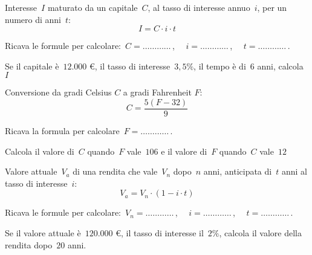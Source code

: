 \subsubsection*{}

\begin{esercizio}
\label{ese:20.53}
Interesse~\(I\) maturato da un capitale~\(C\), al tasso di interesse 
annuo~\(i\), 
per un numero di anni~\(t\):
\begin{equation*}
  I=C\cdot i\cdot t
\end{equation*}

Ricava le formule per calcolare:~\(C=\ldots\ldots\ldots\ldots\)\,, \(\quad 
i=\ldots\ldots\ldots\ldots\)\,, \(\quad t =\ldots\ldots\ldots\ldots\)\,.

Se il capitale è~\(12.000\) €, il tasso di interesse~\(3,5\%\), il tempo è 
di~\(6\) 
anni, calcola~\(I\)
\end{esercizio}

\begin{esercizio}
\label{ese:20.54}
Conversione da gradi Celsius \(C\) a gradi Fahrenheit \(F\):
\begin{equation*}
  C=\frac{5(F-32)}{9}
\end{equation*}

Ricava la formula per calcolare\, \(F=\ldots\ldots\ldots\ldots\)\,.

Calcola il valore di~\(C\) quando~\(F\) vale~\(106\) e il valore di~\(F\) 
quando~\(C\) vale~\(12\)
\end{esercizio}

\begin{esercizio}
\label{ese:20.55}
Valore attuale~\(V_a\) di una rendita che vale~\(V_n\) dopo~\(n\) anni, 
anticipata di~\(t\) anni al tasso di interesse~\(i\):
\begin{equation*}
  V_{a}=V_{n}\cdot (1-i\cdot t)
\end{equation*}

Ricava le formule per calcolare:~\(V_n=\ldots\ldots\ldots\ldots\)\,, \(\quad 
i=\ldots\ldots\ldots\ldots\)\,, \(\quad t =\ldots\ldots\ldots\ldots\)\,.

Se il valore attuale è~\(120.000\) €, il tasso di interesse il~\(2\%\), 
calcola il valore della rendita dopo~\(20\) anni.
\end{esercizio}

